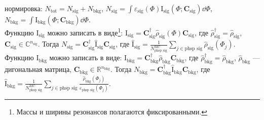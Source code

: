 \documentclass{beamer}
\begin{document}
\begin{frame}
\begin{minipage}[t]{0.49\linewidth}
  нормировка: $\textstyle{}N_{\text{tot}} = N_{\text{sig}} + N_{\text{bkg}}$,
  $\textstyle{}N_{\text{sig}}=\int\varepsilon_{\text{sig}}(\Phi)\text{I}_{\text{sig}}(\Phi;\bm{C}_{\text{sig}})\dd{\Phi}$,
  $\textstyle{}N_{\text{bkg}}=\int{}\text{I}_{\text{bkg}}(\Phi; \bm{C}_{\text{bkg}})\dd{\Phi}$.\\
  Функцию $\text{I}_{\text{sig}}$
  можно записать в виде\footnote{\scriptsize Массы и ширины резонансов полагаются
    фиксированными.}:
  $\textstyle{}\text{I}_{\text{sig}}=\bm{C}^{\dag}_{\text{sig}}\hat{\rho}_{\text{sig}}(\Phi)\bm{C}_{\text{sig}}$,
  где $\textstyle{}\hat{\rho}^{\dag}_{\text{sig}}=\hat{\rho}_{\text{sig}}$,
  $\textstyle{}\bm{C}_{\text{sig}}\in\mathbb{C}^{n_{\text{sig}}}$.
  Тогда $\textstyle{}N_{\text{sig}}=\bm{C}^{\dag}_{\text{sig}}\hat{\text{I}}_{\text{sig}}\bm{C}_{\text{sig}}$,
  где
  $\textstyle{}\hat{\text{I}}_{\text{sig}}=\frac{1}{N^{\text{MC}}_{\text{phsp sig}}}\sum_{j\in\text{phsp sig}}\hat{\rho}_{\text{sig}}(\Phi_j)$.\\
  Функцию $\textstyle{}\text{I}_{\text{bkg}}$ можно записать в виде:
  $\textstyle{}\text{I}_{\text{bkg}}=\bm{C}^{\dag}_{\text{bkg}}\hat{\rho}_{\text{bkg}}\bm{C}_{\text{bkg}}$, где
  $\textstyle{}\hat{\rho}^{\dag}_{\text{bkg}}=\hat{\rho}_{\text{bkg}}$, $\hat{\rho}_{\text{bkg}}$ ---
  дигональная матрица, $\bm{C}_{\text{bkg}}\in\mathbb{R}^{n_{\text{bkg}}}$. Тогда
  $\textstyle{}N_{\text{bkg}}=\bm{C}^{\dag}_{\text{bkg}}\hat{\text{I}}_{\text{bkg}}\bm{C}_{\text{bkg}}$, где
  $\textstyle{}\hat{\text{I}}_{\text{bkg}}=\frac{1}{N^{\text{MC}}_{\text{phsp sig}}}\sum_{j \in \text{phsp sig}}\frac{\hat{\rho}_{\text{bkg}}(\Phi_j)}{\varepsilon_{\text{phsp sig}}(\Phi_j)}$.
\end{minipage}
\end{frame}
\end{document}
